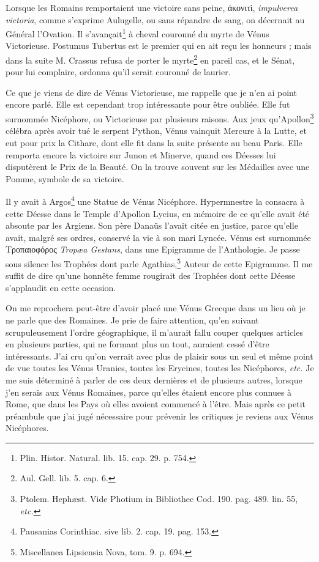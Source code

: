 \documentclass[a4paper, 18pt, oneside]{article}
\begin{document}
Lorsque les Romains remportaient une victoire sans peine, ἀκονιτὶ, \emph{impulverea victoria}, comme s'exprime Aulugelle, ou sans répandre de sang, on décernait au Général l'Ovation. Il s'avançait\footnote{Plin. Histor. Natural. lib. 15. cap. 29. p. 754.} à cheval couronné du myrte de Vénus Victorieuse. Postumus Tubertus est le premier qui en ait reçu les honneurs ; mais dans la suite M. Crassus refusa de porter le myrte\footnote{Aul. Gell. lib. 5. cap. 6.} en pareil cas, et le Sénat, pour lui complaire, ordonna qu'il serait couronné de laurier.

Ce que je viens de dire de Vénus Victorieuse, me rappelle que je n'en ai point encore parlé. Elle est cependant trop intéressante pour être oubliée. Elle fut surnommée Nicéphore, ou Victorieuse par plusieurs raisons. Aux jeux qu'Apollon\footnote{Ptolem. Hephæst. Vide Photium in Bibliothec Cod. 190. pag. 489. lin. 55, \emph{etc.}} célébra après avoir tué le serpent Python, Vénus vainquit Mercure à la Lutte, et eut pour prix la Cithare, dont elle fit dans la suite présente au beau Paris. Elle remporta encore la victoire sur Junon et Minerve, quand ces Déesses lui disputèrent le Prix de la Beauté. On la trouve souvent sur les Médailles avec une Pomme, symbole de sa victoire.

Il y avait à Argos\footnote{Pausanias Corinthiac. sive lib. 2. cap. 19. pag. 153.} une Statue de Vénus Nicéphore. Hypermnestre la consacra à cette Déesse dans le Temple d'Apollon Lycius, en mémoire de ce qu'elle avait été absoute par les Argiens. Son père Danaüs l'avait citée en justice, parce qu'elle avait, malgré ses ordres, conservé la vie à son mari Lyncée. Vénus est surnommée Τροπαιοφόρος \emph{Tropæa Gestans}, dans une Epigramme de l'Anthologie. Je passe sous silence les Trophées dont parle Agathias,\footnote{Miscellanea Lipsiensia Nova, tom. 9. p. 694.} Auteur de cette Epigramme. Il me suffit de dire qu'une honnête femme rougirait des Trophées dont cette Déesse s'applaudit en cette occasion.

On me reprochera peut-être d'avoir placé une Vénus Grecque dans un lieu où je ne parle que des Romaines. Je prie de faire attention, qu'en suivant scrupuleusement l'ordre géographique, il m'aurait fallu couper quelques articles en plusieurs parties, qui ne formant plus un tout, auraient cessé d'être intéressants. J'ai cru qu'on verrait avec plus de plaisir sous un seul et même point de vue toutes les Vénus Uranies, toutes les Erycines, toutes les Nicéphores, \emph{etc.} Je me suis déterminé à parler de ces deux dernières et de plusieurs autres, lorsque j'en serais aux Vénus Romaines, parce qu'elles étaient encore plus connues à Rome, que dans les Pays où elles avoient commencé à l'être. Mais après ce petit préambule que j'ai jugé nécessaire pour prévenir les critiques je reviens aux Vénus Nicéphores.
\end{document}

